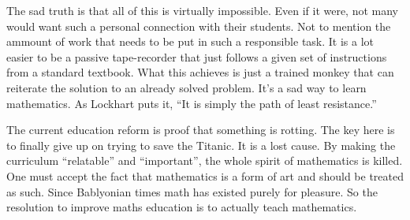 \documentclass[a4paper,12pt]{article}
\begin{document}
The sad truth is that all of this is virtually impossible. Even if it were, not
many would want such a personal connection with their students. Not to mention
the ammount of work that needs to be put in such a responsible task. It is a lot
easier to be a passive tape-recorder that just follows a given set of
instructions from a standard textbook. What this achieves is just a trained
monkey that can reiterate the solution to an already solved problem. It's
a sad way to learn mathematics. As Lockhart puts it, ``It is simply the 
path of least resistance.''

The current education reform is proof that something is rotting. The key here is
 to finally give up on trying to save the Titanic. It is a lost cause. By making
the curriculum ``relatable'' and ``important'', the whole spirit of
mathematics is killed. One must accept the fact that mathematics is a form of
art and should be treated as such. Since Bablyonian times math has existed
purely for pleasure. So the resolution to improve maths education is to actually
teach mathematics.
\end{document}
